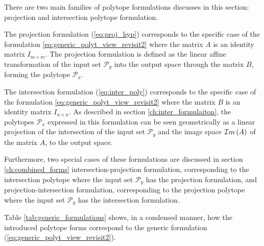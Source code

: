 There are two main families of polytope formulations discusses in this section: projection and intersection polytope formulation. 

The projection formulation (\ref{eq:proj_hyp}) corresponds to the specific case of the formulation \ref{eq:generic_polyt_view_revisit2} where the matrix $A$ is an identity matrix $I_{m\times m}$.
The projection formulation is defined as the linear affine transformation of the input set $\mathcal{P}_y$ into the output space through the matrix $B$, forming the polytope $\mathcal{P}_x$. 

The intersection formulation (\ref{eq:inter_poly}) corresponds to the specific case of the formulation 
\ref{eq:generic_polyt_view_revisit2} where the matrix $B$ is an identity matrix $I_{n\times n}$. As described in section \ref{ch:inter_formulaiton}, the polytopes $\mathcal{P}_x$ expressed in this formulation can be seen geometrically as a linear projection of the intersection of the input set $\mathcal{P}_y$ and the image space $\mathcal{I}m\left(A\right)$ of the matrix $A$, to the output space. 

Furthermore, two special cases of these formulations are discussed in section \ref{ch:combined_forms} intersection-projection formulation, corresponding to the intersection polytope where the input set $\mathcal{P}_y$ has the projection formulation, and projection-intersection formulation, corresponding to the projection polytope where the input set $\mathcal{P}_y$ has the intersection formulation. 

Table \ref{tab:generic_formulations} shows, in a condensed manner, how the introduced polytope forms correspond to the generic formulation (\ref{eq:generic_polyt_view_revisit2}).


